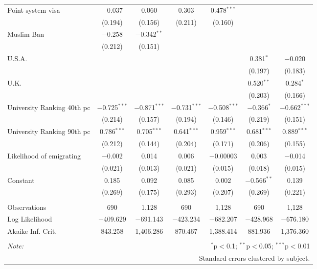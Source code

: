 \begin{sidewaystable}[!htbp]
\begin{tabular}{@{\extracolsep{5pt}}lcccccc}
  Point-system visa & $-$0.037 & 0.060 & 0.303 & 0.478$^{***}$ &  &  \\ 
  & (0.194) & (0.156) & (0.211) & (0.160) &  &  \\ 
  Muslim Ban & $-$0.258 & $-$0.342$^{**}$ &  &  &  &  \\ 
  & (0.212) & (0.151) &  &  &  &  \\ 
  U.S.A. &  &  &  &  & 0.381$^{*}$ & $-$0.020 \\ 
  &  &  &  &  & (0.197) & (0.183) \\ 
  U.K. &  &  &  &  & 0.520$^{**}$ & 0.284$^{*}$ \\ 
  &  &  &  &  & (0.203) & (0.166) \\ 
  University Ranking 40th pc & $-$0.725$^{***}$ & $-$0.871$^{***}$ & $-$0.731$^{***}$ & $-$0.508$^{***}$ & $-$0.366$^{*}$ & $-$0.662$^{***}$ \\ 
  & (0.214) & (0.157) & (0.194) & (0.146) & (0.219) & (0.151) \\ 
  University Ranking 90th pc & 0.786$^{***}$ & 0.705$^{***}$ & 0.641$^{***}$ & 0.959$^{***}$ & 0.681$^{***}$ & 0.889$^{***}$ \\ 
  & (0.212) & (0.144) & (0.204) & (0.171) & (0.206) & (0.155) \\ 
  Likelihood of emigrating & $-$0.002 & 0.014 & 0.006 & $-$0.00003 & 0.003 & $-$0.014 \\ 
  & (0.021) & (0.013) & (0.021) & (0.015) & (0.018) & (0.015) \\ 
  Constant & 0.185 & 0.092 & 0.085 & 0.002 & $-$0.566$^{**}$ & 0.139 \\ 
  & (0.269) & (0.175) & (0.293) & (0.207) & (0.269) & (0.221) \\ 
 \hline \\[-1.8ex] 
Observations & 690 & 1,128 & 690 & 1,128 & 690 & 1,128 \\ 
Log Likelihood & $-$409.629 & $-$691.143 & $-$423.234 & $-$682.207 & $-$428.968 & $-$676.180 \\ 
Akaike Inf. Crit. & 843.258 & 1,406.286 & 870.467 & 1,388.414 & 881.936 & 1,376.360 \\ 
\hline 
\hline \\[-1.8ex] 
\textit{Note:}  & \multicolumn{6}{r}{$^{*}$p$<$0.1; $^{**}$p$<$0.05; $^{***}$p$<$0.01} \\ 
 & \multicolumn{6}{r}{Standard errors clustered by subject.} \\ 
\end{tabular} 
\end{sidewaystable} 
